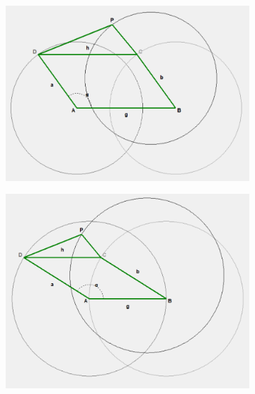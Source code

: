 \documentclass{article}
\begin{document}
\begin{figure}[h]
\begin{subfigure}{0.19\textwidth}
		\caption{}
	\end{subfigure}
	\hfill
	\begin{subfigure}{0.19\textwidth}
		\centering
		\includegraphics[width=\linewidth, height=0.95\linewidth, keepaspectratio]{./Figures/27_motion_cases/100.png}
		\caption{}
	\end{subfigure}
	\hfill
	\begin{subfigure}{0.19\textwidth}
		\centering
		\includegraphics[width=\linewidth, height=0.95\linewidth, keepaspectratio]{./Figures/27_motion_cases/000.png}

\end{subfigure}
\end{figure}
\end{document}
